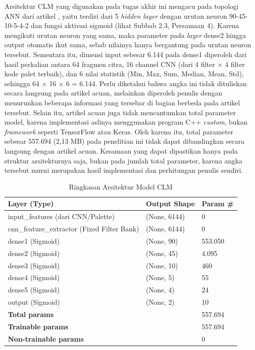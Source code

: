 Arsitektur CLM yang digunakan pada tugas akhir ini mengacu pada topologi ANN dari artikel \textcite{wozniak2021deep}, yaitu terdiri dari 5 \textit{hidden layer} dengan urutan neuron 90-45-10-5-4-2 dan fungsi aktivasi sigmoid (lihat Subbab 2.3, Persamaan 4). Karena mengikuti urutan neuron yang sama, maka parameter pada \textit{layer} dense2 hingga output otomatis ikut sama, sebab nilainya hanya bergantung pada urutan neuron tersebut. Sementara itu, dimensi input sebesar 6.144 pada dense1 diperoleh dari hasil perkalian antara 64 fragmen citra, 16 channel CNN (dari 4 filter × 4 filter kode palet terbaik), dan 6 nilai statistik (Min, Max, Sum, Median, Mean, Std), sehingga 64 × 16 × 6 = 6.144. Perlu diketahui bahwa angka ini tidak dituliskan secara langsung pada artikel acuan, melainkan diperoleh penulis dengan menurunkan beberapa informasi yang tersebar di bagian berbeda pada artikel tersebut. Selain itu, artikel acuan juga tidak mencantumkan total parameter model, karena implementasi aslinya menggunakan program C++ \textit{custom}, bukan \textit{framework} seperti TensorFlow atau Keras. Oleh karena itu, total parameter sebesar 557.694 (2,13 MB) pada penelitian ini tidak dapat dibandingkan secara langsung dengan artikel acuan. Kesamaan yang dapat dipastikan hanya pada struktur arsitekturnya saja, bukan pada jumlah total parameter, karena angka tersebut murni merupakan hasil implementasi dan perhitungan penulis sendiri.

\begin{table}[htbp]
	\centering
	\caption{Ringkasan Arsitektur Model CLM}
	\label{tab:arsitektur_model_clm}
	\begin{tabular}{|l|l|l|}
		\hline
		\textbf{Layer (Type)} & \textbf{Output Shape} & \textbf{Param \#} \\ \hline
		input\_features (dari CNN/Palette) & (None, 6144) & 0 \\ \hline
		cnn\_feature\_extractor (Fixed Filter Bank) & (None, 6144) & 0 \\ \hline
		dense1 (Sigmoid) & (None, 90) & 553.050 \\ \hline
		dense2 (Sigmoid) & (None, 45) & 4.095 \\ \hline
		dense3 (Sigmoid) & (None, 10) & 460 \\ \hline
		dense4 (Sigmoid) & (None, 5) & 55 \\ \hline
		dense5 (Sigmoid) & (None, 4) & 24 \\ \hline
		output (Sigmoid) & (None, 2) & 10 \\ \hline
		\multicolumn{2}{|l|}{\textbf{Total params}} & 557.694 \\ \hline
		\multicolumn{2}{|l|}{\textbf{Trainable params}} & 557.694 \\ \hline
		\multicolumn{2}{|l|}{\textbf{Non-trainable params}} & 0 \\ \hline
	\end{tabular}
\end{table}

